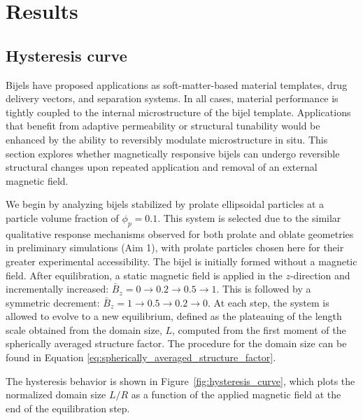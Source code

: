 \section{Results}\label{sec:results_p2}
\subsection{Hysteresis curve}
\label{section:hysteresis_curve}

Bijels have proposed applications as soft-matter-based material templates, drug delivery vectors, and separation systems. In all cases, material performance is 
tightly coupled to the internal microstructure of the bijel template. Applications that benefit from adaptive permeability or structural tunability would be 
enhanced by the ability to reversibly modulate microstructure in situ. This section explores whether magnetically responsive bijels can undergo reversible 
structural changes upon repeated application and removal of an external magnetic field.

We begin by analyzing bijels stabilized by prolate ellipsoidal particles at a particle volume fraction of \(\phi_p = 0.1\). This system is selected due to the 
similar qualitative response mechanisms observed for both prolate and oblate geometries in preliminary simulations (Aim 1), with prolate particles chosen here 
for their greater experimental accessibility. The bijel is initially formed without a magnetic field. After equilibration, a static magnetic field is applied 
in the \(z\)-direction and incrementally increased: \(\bar{B}_z = 0 \rightarrow 0.2 \rightarrow 0.5 \rightarrow 1\). This is followed by a symmetric 
decrement: \(\bar{B}_z = 1 \rightarrow 0.5 \rightarrow 0.2 \rightarrow 0\). At each step, the system is allowed to evolve to a new equilibrium, defined as
the plateauing of the length scale obtained from the domain size, \(L\), computed from the first moment of the spherically averaged structure factor.
\cite{kendon_3d_1999,kendon_inertial_2001} The procedure for the domain size can be found in Equation \ref{eq:spherically_averaged_structure_factor}.

The hysteresis behavior is shown in Figure~\ref{fig:hysteresis_curve}, which plots the normalized domain size \(L/R\) as a function of the applied magnetic 
field at the end of the equilibration step.

